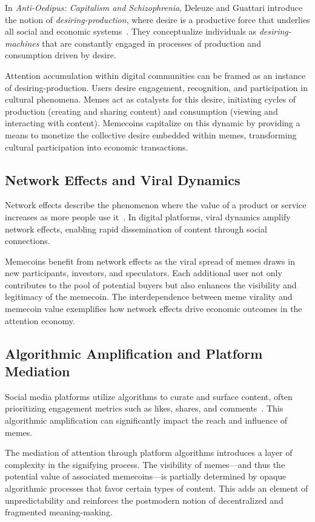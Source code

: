\documentclass[a4paper,12pt]{article}
\begin{document}
In \textit{Anti-Oedipus: Capitalism and Schizophrenia}, Deleuze and Guattari introduce the notion of \textit{desiring-production}, where desire is a productive force that underlies all social and economic systems~\cite{deleuze1983anti}. They conceptualize individuals as \textit{desiring-machines} that are constantly engaged in processes of production and consumption driven by desire.

Attention accumulation within digital communities can be framed as an instance of desiring-production. Users desire engagement, recognition, and participation in cultural phenomena. Memes act as catalysts for this desire, initiating cycles of production (creating and sharing content) and consumption (viewing and interacting with content). Memecoins capitalize on this dynamic by providing a means to monetize the collective desire embedded within memes, transforming cultural participation into economic transactions.

\subsection{Network Effects and Viral Dynamics}

Network effects describe the phenomenon where the value of a product or service increases as more people use it~\cite{shapiro1999information}. In digital platforms, viral dynamics amplify network effects, enabling rapid dissemination of content through social connections.

Memecoins benefit from network effects as the viral spread of memes draws in new participants, investors, and speculators. Each additional user not only contributes to the pool of potential buyers but also enhances the visibility and legitimacy of the memecoin. The interdependence between meme virality and memecoin value exemplifies how network effects drive economic outcomes in the attention economy.

\subsection{Algorithmic Amplification and Platform Mediation}

Social media platforms utilize algorithms to curate and surface content, often prioritizing engagement metrics such as likes, shares, and comments~\cite{gillespie2014algorithm}. This algorithmic amplification can significantly impact the reach and influence of memes.

The mediation of attention through platform algorithms introduces a layer of complexity in the signifying process. The visibility of memes—and thus the potential value of associated memecoins—is partially determined by opaque algorithmic processes that favor certain types of content. This adds an element of unpredictability and reinforces the postmodern notion of decentralized and fragmented meaning-making.
\end{document}
